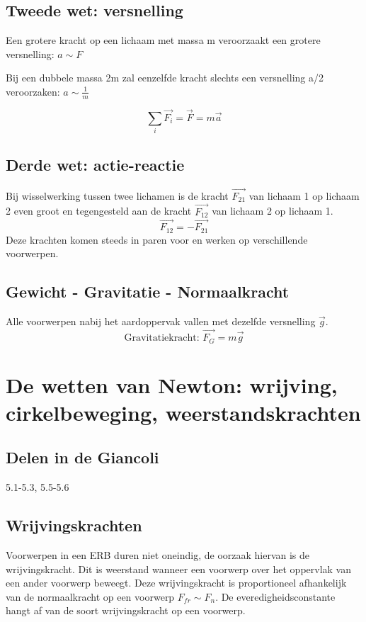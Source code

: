 \documentclass[12pt,a4paper]{article}
\begin{document}
    \subsection{Tweede wet: versnelling}
    Een grotere kracht op een lichaam met massa m veroorzaakt een grotere versnelling: $a \sim F$

    Bij een dubbele massa 2m zal eenzelfde kracht slechts een versnelling a/2 veroorzaken: $a \sim \frac{1}{m}$

    \[\sum_{i} \vec{F_i} = \vec{F} = m\vec{a}\]

    \subsection{Derde wet: actie-reactie}
    Bij wisselwerking tussen twee lichamen is de kracht \(\vec{F_{21}}\) van lichaam 1 op lichaam 2 even groot en tegengesteld aan de kracht \(\vec{F_{12}}\) van lichaam 2 op lichaam 1.
    \[\vec{F_{12}} = -\vec{F_{21}}\]
    Deze krachten komen steeds in paren voor en werken op verschillende voorwerpen.

    \subsection{Gewicht - Gravitatie - Normaalkracht}
    Alle voorwerpen nabij het aardoppervak vallen met dezelfde versnelling $\vec{g}$.
    \[\text{Gravitatiekracht: } \vec{F_G} = m\vec{g}\]


    \section{De wetten van Newton: wrijving, cirkelbeweging, weerstandskrachten}

    \subsection{Delen in de Giancoli}
    5.1-5.3, 5.5-5.6
    
    \subsection{Wrijvingskrachten}
    Voorwerpen in een ERB duren niet oneindig, de oorzaak hiervan is de wrijvingskracht. Dit is weerstand wanneer een voorwerp
    over het oppervlak van een ander voorwerp beweegt. Deze wrijvingskracht is proportioneel afhankelijk van de normaalkracht
    op een voorwerp $F_{fr} \sim F_{n}$.  De everedigheidsconstante hangt af van de soort wrijvingskracht op een voorwerp.\\
    
\end{document}
